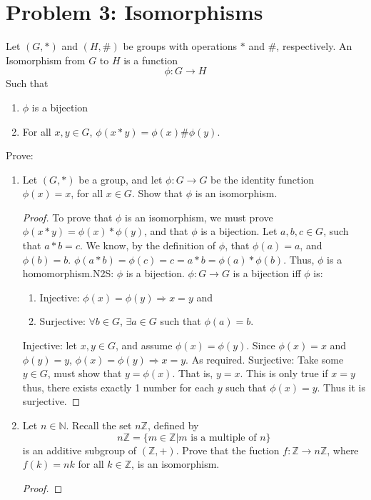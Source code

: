 \documentclass[12pt]{article}
\newcommand{\N}{\mathbb{N}}
\newcommand{\Z}{\mathbb{Z}}
\begin{document}
\section{Problem 3: Isomorphisms}
Let $(G,*)$ and $(H,\#)$ be groups with operations $*$ and $\#$, respectively. An Isomorphism from $G$ to $H$ is a function $$\phi:G\longrightarrow H$$
Such that \begin{enumerate}
    \item $\phi$ is a bijection
    \item For all $x,y\in G$, $\phi(x*y)=\phi(x)\#\phi(y)$.
\end{enumerate}
Prove:
\begin{enumerate}
    \item Let $(G,*)$ be a group, and let $\phi:G\longrightarrow G$ be the identity function $\phi(x)=x$, for all $x\in G$. Show that $\phi$ is an isomorphism.
    \begin{proof}
    To prove that $\phi$ is an isomorphism, we must prove $\phi(x*y)=\phi(x)*\phi(y)$, and that $\phi$ is a bijection. \newline Let $a,b,c\in G$, such that $a*b=c$. We know, by the definition of $\phi$, that $\phi(a)=a$, and $\phi(b)=b$. \newline $\phi(a*b)=\phi(c)=c=a*b=\phi(a)*\phi(b)$. Thus, $\phi$ is a homomorphism.\newline N2S: $\phi$ is a bijection. $\phi:G\longrightarrow G$ is a bijection iff $\phi$ is:\begin{enumerate}
        \item Injective: $\phi(x)=\phi(y)\Longrightarrow x=y$ and
        \item Surjective:  $\forall b\in G$, $\exists a\in G$ such that $\phi(a)=b$.
    \end{enumerate}
    Injective: let $x,y\in G$, and assume $\phi(x)=\phi(y)$. Since $\phi(x)=x$ and $\phi(y)=y$, $\phi(x)=\phi(y)\Longrightarrow x=y$. As required.
    \newline Surjective: Take some $y\in G$, must show that $y=\phi(x)$. That is, $y=x$. This is only true if $x=y$ thus, there exists exactly 1 number for each $y$ such that $\phi(x)=y$. Thus it is surjective.
    \end{proof}
    \item Let $n\in\N$. Recall the set $n\Z$, defined by $$n\Z=\{m\in\Z|m \text{ is a multiple of }n\}$$ is an additive subgroup of $(\Z,+)$. Prove that the fuction $f:\Z\longrightarrow n\Z$, where $f(k)=nk$ for all $k\in\Z$, is an isomorphism.
    \begin{proof}

\end{proof}
\end{enumerate}
\end{document}
